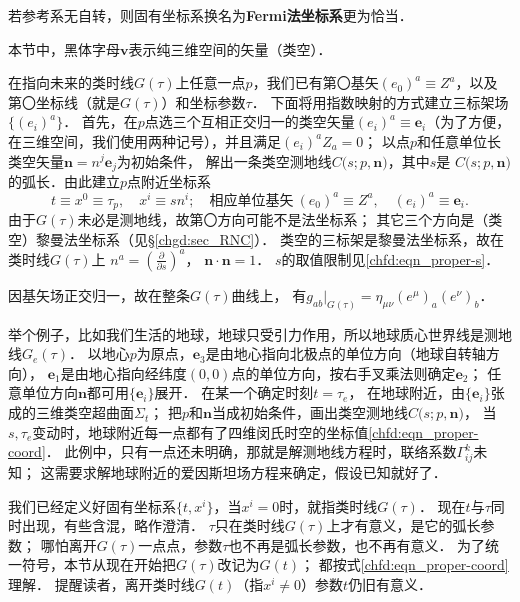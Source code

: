 若参考系无自转，则固有坐标系换名为{\bfseries\heiti Fermi法坐标系}更为恰当．

本节中，黑体字母$\boldsymbol{v}$表示纯三维空间的矢量（类空）．


在指向未来的类时线$G(\tau)$上任意一点$p$，我们已有第〇基矢$(e_0)^a\equiv Z^a$，以及
第〇坐标线（就是$G(\tau)$）和坐标参数$\tau$．
下面将用指数映射的方式建立三标架场$\{(e_i)^a\}$．
首先，在$p$点选三个互相正交归一的类空矢量$(e_i)^a \equiv \boldsymbol{e}_i$（为了方便，
在三维空间，我们使用两种记号），并且满足$(e_i)^aZ_a=0$；
以点$p$和任意单位长类空矢量$\boldsymbol{n}= n^j \boldsymbol{e}_j$为初始条件，
解出一条类空测地线$C\bigl(s;p,\boldsymbol{n}\bigr)$，其中$s$是
$C\bigl(s;p,\boldsymbol{n}\bigr)$的弧长．由此建立$p$点附近坐标系
\begin{equation}\label{chfd:eqn_proper-coord}
    t \equiv x^0 \equiv \tau_p, \quad x^i \equiv s n^i;\quad
    \text{相应单位基矢}\ (e_0)^a\equiv Z^a,\quad (e_i)^a \equiv \boldsymbol{e}_i .
\end{equation}
由于$G(\tau)$未必是测地线，故第〇方向可能不是法坐标系；
其它三个方向是（类空）黎曼法坐标系（见\S\ref{chgd:sec_RNC}）．
类空的三标架是黎曼法坐标系，故在类时线$G(\tau)$上
$n^a = (\frac{\partial}{\partial s})^a$，
$\boldsymbol{n}\cdot \boldsymbol{n}=1$．
$s$的取值限制见\eqref{chfd:eqn_proper-s}．

因基矢场正交归一，故在整条$G(\tau)$曲线上，
有$g_{ab}|_{G(\tau)}= \eta_{\mu\nu}(e^\mu)_a (e^\nu)_b$．

\begin{example}\label{chfd:exm_proper-earth}
举个例子，比如我们生活的地球，地球只受引力作用，所以地球质心世界线是测地线$G_{e}(\tau)$．
以地心$p$为原点，$\boldsymbol{e}_3$是由地心指向北极点的单位方向（地球自转轴方向），
$\boldsymbol{e}_1$是由地心指向经纬度$(0,0)$点的单位方向，按右手叉乘法则确定$\boldsymbol{e}_2$；
任意单位方向$\boldsymbol{n}$都可用$\{\boldsymbol{e}_i\}$展开．
在某一个确定时刻$t=\tau_e$，
在地球附近，由$\{\boldsymbol{e}_i\}$张成的三维类空超曲面$\Sigma_t$；
把$p$和$\boldsymbol{n}$当成初始条件，画出类空测地线$C\bigl(s;p,\boldsymbol{n}\bigr)$，
当$s,\tau_e$变动时，地球附近每一点都有了四维闵氏时空的坐标值\eqref{chfd:eqn_proper-coord}．
此例中，只有一点还未明确，那就是解测地线方程时，联络系数$\Gamma^k_{ij}$未知；
这需要求解地球附近的爱因斯坦场方程来确定，假设已知就好了．
\end{example}


我们已经定义好固有坐标系$\{t,x^i\}$，当$x^i=0$时，就指类时线$G(\tau)$．
现在$t$与$\tau$同时出现，有些含混，略作澄清．
$\tau$只在类时线$G(\tau)$上才有意义，是它的弧长参数；
哪怕离开$G(\tau)$一点点，参数$\tau$也不再是弧长参数，也不再有意义．
为了统一符号，本节从现在开始把$G(\tau)$改记为$G(t)$；
都按式\eqref{chfd:eqn_proper-coord}理解．
提醒读者，离开类时线$G(t)$（指$x^i \neq 0$）参数$t$仍旧有意义．


